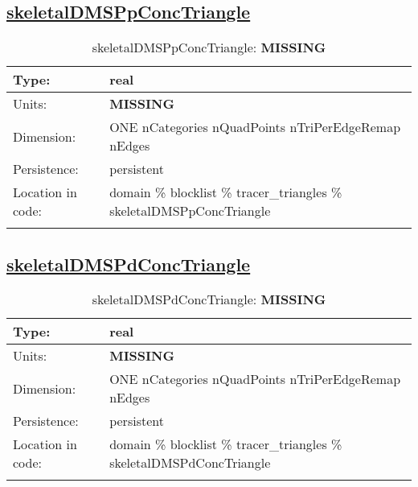 \subsection[skeletalDMSPpConcTriangle]{\hyperref[sec:var_tab_tracer_triangles]{skeletalDMSPpConcTriangle}}
\label{subsec:var_sec_tracer_triangles_skeletalDMSPpConcTriangle}
\begin{center}
\begin{longtable}{| p{2.0in} | p{4.0in} |}
        \hline 
        Type: & real \\
        \hline 
        Units: & {\bf \color{red} MISSING} \\
        \hline 
        Dimension: & ONE nCategories nQuadPoints nTriPerEdgeRemap nEdges \\
        \hline 
        Persistence: & persistent \\
        \hline 
         Location in code: & domain \% blocklist \% tracer\_triangles \% skeletalDMSPpConcTriangle \\
         \hline 
    \caption{skeletalDMSPpConcTriangle: {\bf \color{red} MISSING}}
\end{longtable}
\end{center}
\subsection[skeletalDMSPdConcTriangle]{\hyperref[sec:var_tab_tracer_triangles]{skeletalDMSPdConcTriangle}}
\label{subsec:var_sec_tracer_triangles_skeletalDMSPdConcTriangle}
\begin{center}
\begin{longtable}{| p{2.0in} | p{4.0in} |}
        \hline 
        Type: & real \\
        \hline 
        Units: & {\bf \color{red} MISSING} \\
        \hline 
        Dimension: & ONE nCategories nQuadPoints nTriPerEdgeRemap nEdges \\
        \hline 
        Persistence: & persistent \\
        \hline 
         Location in code: & domain \% blocklist \% tracer\_triangles \% skeletalDMSPdConcTriangle \\
         \hline 
    \caption{skeletalDMSPdConcTriangle: {\bf \color{red} MISSING}}
\end{longtable}
\end{center}
